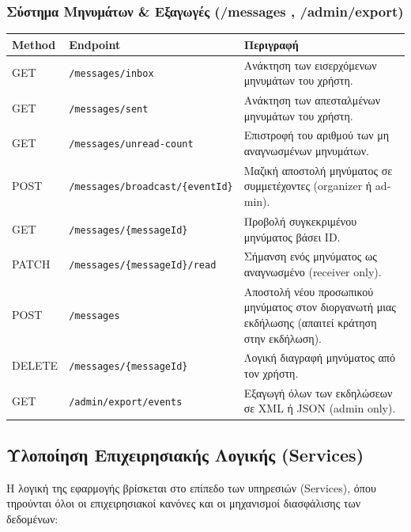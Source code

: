 \documentclass[12pt]{fphw}
\newcommand{\en}[1]{\foreignlanguage{english}{#1}}
\begin{document}
\subsubsection{Σύστημα Μηνυμάτων \& Εξαγωγές (/messages , /admin/export)}
\begin{table}[h!]
    \centering
    \small
    \begin{tabularx}{\textwidth}{llX}
    \toprule
    \textbf{Method} & \textbf{Endpoint} & \textbf{Περιγραφή} \\
    \midrule
    \en{GET} & \en{\texttt{/messages/inbox}} & Ανάκτηση των εισερχόμενων μηνυμάτων του χρήστη. \\
    \addlinespace[1pt]
    \en{GET} & \en{\texttt{/messages/sent}} & Ανάκτηση των απεσταλμένων μηνυμάτων του χρήστη. \\
    \addlinespace[1pt]
    \en{GET} & \en{\texttt{/messages/unread-count}} & Επιστροφή του αριθμού των μη αναγνωσμένων μηνυμάτων. \\
    \addlinespace[1pt]
    \en{POST} & \en{\texttt{/messages/broadcast/\{eventId\}}} & Μαζική αποστολή μηνύματος σε συμμετέχοντες (\en{organizer} ή \en{admin}). \\
    \addlinespace[1pt]
    \en{GET} & \en{\texttt{/messages/\{messageId\}}} & Προβολή συγκεκριμένου μηνύματος βάσει \en{ID}. \\
    \addlinespace[1pt]
    \en{PATCH} & \en{\texttt{/messages/\{messageId\}/read}} & Σήμανση ενός μηνύματος ως αναγνωσμένο (\en{receiver only}). \\
    \addlinespace[1pt]
    \en{POST} & \en{\texttt{/messages}} & Αποστολή νέου προσωπικού μηνύματος στον διοργανωτή μιας εκδήλωσης (απαιτεί κράτηση στην εκδήλωση). \\
    \addlinespace[1pt]
    \en{DELETE} & \en{\texttt{/messages/\{messageId\}}} & Λογική διαγραφή μηνύματος από τον χρήστη. \\
    \midrule
    \en{GET} & \en{\texttt{/admin/export/events}} & Εξαγωγή όλων των εκδηλώσεων σε \en{XML} ή \en{JSON} (\en{admin only}). \\
    \bottomrule
    \end{tabularx}
\end{table}


\subsection{Υλοποίηση Επιχειρησιακής Λογικής (\en{Services})}
Η λογική της εφαρμογής βρίσκεται στο επίπεδο των υπηρεσιών (\en{Services}), όπου τηρούνται όλοι οι επιχειρησιακοί κανόνες και οι μηχανισμοί διασφάλισης των δεδομένων:
\end{document}
